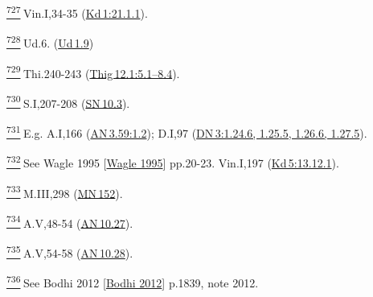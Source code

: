 \label{footprints_split_025.html_fn727}
\hyperref[footprints_split_019.htmlux5cux23fnref727]{\textsuperscript{727}} Vin.I,34-35
(\href{https://suttacentral.net/pli-tv-kd1/en/brahmali\#21.1.1}{Kd\,1:21.1.1}).

\label{footprints_split_025.html_fn728}
\hyperref[footprints_split_019.htmlux5cux23fnref728]{\textsuperscript{728}} Ud.6.
(\href{https://suttacentral.net/ud1.9/en/sujato}{Ud\,1.9})

\label{footprints_split_025.html_fn729}
\hyperref[footprints_split_019.htmlux5cux23fnref729]{\textsuperscript{729}} Thi.240-243
(\href{https://suttacentral.net/thig12.1/en/sujato\#5.1}{Thig\,12.1:5.1--8.4}).

\label{footprints_split_025.html_fn730}
\hyperref[footprints_split_019.htmlux5cux23fnref730]{\textsuperscript{730}} S.I,207-208
(\href{https://suttacentral.net/sn10.3/en/sujato}{SN\,10.3}).

\label{footprints_split_025.html_fn731}
\hyperref[footprints_split_019.htmlux5cux23fnref731]{\textsuperscript{731}} E.g.
A.I,166
(\href{https://suttacentral.net/an3.59/en/sujato\#1.2}{AN\,3.59:1.2});
D.I,97
(\href{https://suttacentral.net/dn3/en/sujato\#1.24.6}{DN\,3:1.24.6,
1.25.5, 1.26.6, 1.27.5}).

\label{footprints_split_025.html_fn732}
\hyperref[footprints_split_019.htmlux5cux23fnref732]{\textsuperscript{732}} See
{Wagle 1995
{{[}\hyperref[footprints_split_022.htmlux5cux23Wagleux5cux25201995]{Wagle
1995}{]}}} pp.20-23. Vin.I,197
(\href{https://suttacentral.net/pli-tv-kd5/en/brahmali\#13.12.1}{Kd\,5:13.12.1}).

\label{footprints_split_025.html_fn733}
\hyperref[footprints_split_019.htmlux5cux23fnref733]{\textsuperscript{733}} M.III,298
(\href{https://suttacentral.net/mn152/en/sujato}{MN\,152}).

\label{footprints_split_025.html_fn734}
\hyperref[footprints_split_019.htmlux5cux23fnref734]{\textsuperscript{734}} A.V,48-54
(\href{https://suttacentral.net/an10.27/en/sujato}{AN\,10.27}).

\label{footprints_split_025.html_fn735}
\hyperref[footprints_split_019.htmlux5cux23fnref735]{\textsuperscript{735}} A.V,54-58
(\href{https://suttacentral.net/an10.28/en/sujato}{AN\,10.28}).

\label{footprints_split_025.html_fn736}
\hyperref[footprints_split_019.htmlux5cux23fnref736]{\textsuperscript{736}} See
{Bodhi 2012
{{[}\hyperref[footprints_split_022.htmlux5cux23Bodhiux5cux25202012]{Bodhi
2012}{]}}} p.1839, note 2012.

